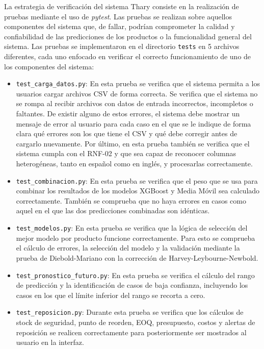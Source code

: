 La estrategia de verificación del sistema Thary consiste en la realización de pruebas mediante el uso de \textit{pytest}. Las pruebas se realizan sobre aquellos componentes del sistema que, de fallar, podrían comprometer la calidad y confiabilidad de las predicciones de los productos o la funcionalidad general del sistema. Las pruebas se implementaron en el directorio \texttt{tests} en 5 archivos diferentes, cada uno enfocado en verificar el correcto funcionamiento de uno de los componentes del sistema:

\begin{itemize}
    \item \texttt{test\_carga\_datos.py}: En esta prueba se verifica que el sistema permita a los usuarios cargar archivos CSV de forma correcta. Se verifica que el sistema no se rompa al recibir archivos con datos de entrada incorrectos, incompletos o faltantes. De existir alguno de estos errores, el sistema debe mostrar un mensaje de error al usuario para cada caso en el que se le indique de forma clara qué errores son los que tiene el CSV y qué debe corregir antes de cargarlo nuevamente. Por último, en esta prueba también se verifica que el sistema cumpla con el RNF-02 y que sea capaz de reconocer columnas heterogéneas, tanto en español como en inglés, y procesarlas correctamente.

    \item \texttt{test\_combinacion.py}: En esta prueba se verifica que el peso que se usa para combinar los resultados de los modelos XGBoost y Media Móvil sea calculado correctamente. También se comprueba que no haya errores en casos como aquel en el que las dos predicciones combinadas son idénticas.

    \item \texttt{test\_modelos.py}: En esta prueba se verifica que la lógica de selección del mejor modelo por producto funcione correctamente. Para esto se comprueba el cálculo de errores, la selección del modelo y la validación mediante la prueba de Diebold-Mariano con la corrección de Harvey-Leybourne-Newbold.

    \item \texttt{test\_pronostico\_futuro.py}: En esta prueba se verifica el cálculo del rango de predicción y la identificación de casos de baja confianza, incluyendo los casos en los que el límite inferior del rango se recorta a cero.

    \item \texttt{test\_reposicion.py}: Durante esta prueba se verifica que los cálculos de stock de seguridad, punto de reorden, EOQ, presupuesto, costos y alertas de reposición se realicen correctamente para posteriormente ser mostrados al usuario en la interfaz.
\end{itemize}

